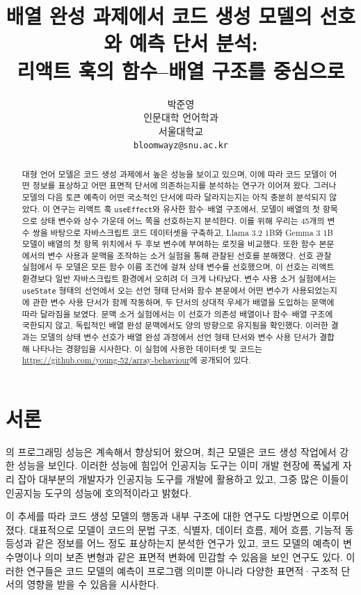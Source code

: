 \documentclass[11pt]{article}
\title{배열 완성 과제에서 코드 생성 모델의 선호와 예측 단서 분석: \\
리액트 훅의 함수--배열 구조를 중심으로}
\author{박준영 \\
  인문대학 언어학과 \\
  서울대학교 \\
\texttt{bloomwayz@snu.ac.kr} \\}
\begin{document}
\maketitle
\begin{abstract}
  대형 언어 모델은 코드 생성 과제에서 높은 성능을 보이고 있으며, 이에 따라 코드 모델이 어떤 정보를 표상하고 어떤 표면적 단서에 의존하는지를 분석하는 연구가 이어져 왔다.
  그러나 모델의 다음 토큰 예측이 어떤 국소적인 단서에 따라 달라지는지는 아직 충분히 분석되지 않았다.
  이 연구는 리액트 훅 \texttt{useEffect}와 유사한 함수--배열 구조에서, 모델이 배열의 첫 항목으로 상태 변수와 상수 가운데 어느 쪽을 선호하는지 분석한다.
  이를 위해 우리는 45개의 변수 쌍을 바탕으로 자바스크립트 코드 데이터셋을 구축하고, Llama 3.2 1B와 Gemma 3 1B 모델이 배열의 첫 항목 위치에서 두 후보 변수에 부여하는 로짓을 비교했다.
  또한 함수 본문에서의 변수 사용과 문맥을 조작하는 소거 실험을 통해 관찰된 선호를 분해했다.
  선호 관찰 실험에서 두 모델은 모든 함수 이름 조건에 걸쳐 상태 변수를 선호했으며, 이 선호는 리액트 환경보다 일반 자바스크립트 환경에서 오히려 더 크게 나타났다.
  변수 사용 소거 실험에서는 \texttt{useState} 형태의 선언에서 오는 선언 형태 단서와 함수 본문에서 어떤 변수가 사용되었는지에 관한 변수 사용 단서가 함께 작동하며, 두 단서의 상대적 우세가 배열을 도입하는 문맥에 따라 달라짐을 보였다.
  문맥 소거 실험에서는 이 선호가 의존성 배열이나 함수--배열 구조에 국한되지 않고, 독립적인 배열 완성 문맥에서도 양의 방향으로 유지됨을 확인했다.
  이러한 결과는 모델의 상태 변수 선호가 배열 완성 과정에서 선언 형태 단서와 변수 사용 단서가 결합해 나타나는 경향임을 시사한다.
  이 실험에 사용한 데이터셋 및 코드는 \url{https://github.com/young-52/array-behaviour}에 공개되어 있다.
\end{abstract}

\section{서론}
\label{sec:intro}

의 프로그래밍 성능은 계속해서 향상되어 왔으며, 최근 모델은 코드 생성 작업에서 강한 성능을 보인다\citep{austin2021synthesis,fried2023incoder}.
이러한 성능에 힘입어 인공지능 도구는 이미 개발 현장에 폭넓게 자리 잡아 대부분의 개발자가 인공지능 도구를 개발에 활용하고 있고, 그중 많은 이들이 인공지능 도구의 성능에 호의적이라고 밝혔다\citep{Sta25Stack}.

이 추세를 따라 코드 생성 모델의 행동과 내부 구조에 대한 연구도 다방면으로 이루어졌다.
대표적으로 모델이 코드의 문법 구조, 식별자, 데이터 흐름, 제어 흐름, 기능적 동등성과 같은 정보를 어느 정도 표상하는지 분석한 연구가 있고\citep{troshin2022probing,ma2024unveiling,maveli2025functional}, 코드 모델의 예측이 변수명이나 의미 보존 변형과 같은 표면적 변화에 민감할 수 있음을 보인 연구도 있다\citep{yefet2020adversarial,wang2024naming,orvalho2025robust}.
이러한 연구들은 코드 모델의 예측이 프로그램 의미뿐 아니라 다양한 표면적·구조적 단서의 영향을 받을 수 있음을 시사한다.
\end{document}
